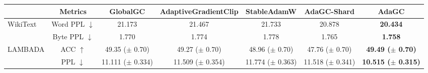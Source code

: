 \begin{tabular}{l|c|ccccc}
\toprule
 & Metrics                & GlobalGC                & AdaptiveGradientClip      & StableAdamW    & AdaGC-Shard     & AdaGC \\
\midrule
\multirow{2}{*}{WikiText} 
 & Word PPL $\downarrow$  & 21.173                  & 21.467                    & 21.733         & 20.878          & \textbf{20.434} \\
 & Byte PPL $\downarrow$  & 1.770                   & 1.774                     & 1.778          & 1.765           & \textbf{1.758} \\
\midrule
\multirow{2}{*}{LAMBADA} 
& ACC $\uparrow$          & 49.35  ($\pm$ 0.70)     & 49.27  ($\pm$ 0.70)       & 48.96 ($\pm$ 0.70)        & 47.76 ($\pm$ 0.70)        & \textbf{49.49 ($\pm$ 0.70)}    \\
& PPL $\downarrow$        & 11.111 ($\pm$ 0.334)    & 11.509 ($\pm$ 0.354)      & 11.774 ($\pm$ 0.363)      & 11.518 ($\pm$ 0.341)      & \textbf{10.515 ($\pm$ 0.315)}  \\
\bottomrule
\end{tabular}
